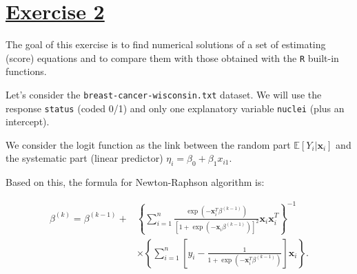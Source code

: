 \documentclass[a4paper,12pt]{article}\usepackage[]{graphicx}\usepackage[]{color}
\def\bx{\mathbf{x}}
\def\op{\left(}
\def\cp{\right)}
\def\oc{\left[}
\def\cc{\right]}
\def\ok{\left\{}
\def\ck{\right\}}
\def\exE{\mathbb{E}}
\begin{document}
\section{\underline{Exercise 2}}


The goal of this exercise is to find numerical solutions of a set of estimating (score) equations and to compare them with those obtained with the \texttt{R} built-in functions.

Let's consider the \verb"breast-cancer-wisconsin.txt" dataset. We will use the response \verb"status" (coded 0/1) and only one explanatory variable  \verb"nuclei" (plus an intercept). 

We consider the logit function as the link between the random part $\exE[Y_i | \bx_i]$ and the systematic part (linear predictor) $\eta_i=\beta_0 + \beta_1 x_{i1}$.

Based on this, the formula for Newton-Raphson algorithm is:

\begin{align*}
\beta^{(k)}=
\beta^{(k-1)} +& 
\ok 
\sum_{i=1}^n 
\frac{\exp \op - \bx_i^T \beta^{(k-1)} \cp}{\oc 1 + \exp\op -\bx_i\beta^{(k-1)}\cp \cc ^2} 
\bx_i\bx_i^T
\ck ^ {-1}\\
&\times
\ok
\sum_{i=1}^n 
\oc 
y_i - \frac{1}{1 + \exp \op -\bx_i^T\beta^{(k-1)} \cp} 
\cc 
\bx_i 
\ck.
\end{align*}
\end{document}

